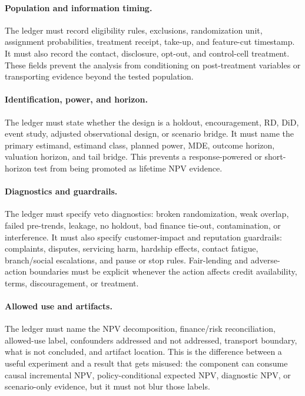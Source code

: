 \documentclass[11pt]{article}
\newcommand{\1}{\mathbf{1}}
\begin{document}
\paragraph{Population and information timing.}
The ledger must record eligibility rules, exclusions, randomization unit,
assignment probabilities, treatment receipt, take-up, and feature-cut
timestamp. It must also record the contact, disclosure, opt-out, and
control-cell treatment. These fields prevent the analysis from conditioning on
post-treatment variables or transporting evidence beyond the tested population.

\paragraph{Identification, power, and horizon.}
The ledger must state whether the design is a holdout, encouragement, RD, DiD,
event study, adjusted observational design, or scenario bridge. It must name
the primary estimand, estimand class, planned power, MDE, outcome horizon,
valuation horizon, and tail bridge. This prevents a response-powered or
short-horizon test from being promoted as lifetime NPV evidence.

\paragraph{Diagnostics and guardrails.}
The ledger must specify veto diagnostics: broken randomization, weak overlap,
failed pre-trends, leakage, no holdout, bad finance tie-out, contamination, or
interference. It must also specify customer-impact and reputation guardrails:
complaints, disputes, servicing harm, hardship effects, contact fatigue,
branch/social escalations, and pause or stop rules. Fair-lending and
adverse-action boundaries must be explicit whenever the action affects credit
availability, terms, discouragement, or treatment.

\paragraph{Allowed use and artifacts.}
The ledger must name the NPV decomposition, finance/risk reconciliation,
allowed-use label, confounders addressed and not addressed, transport
boundary, what is not concluded, and artifact location. This is the difference
between a useful experiment and a result that gets misused: the component can
consume causal incremental NPV, policy-conditional expected NPV, diagnostic
NPV, or scenario-only evidence, but it must not blur those labels.
\end{document}
